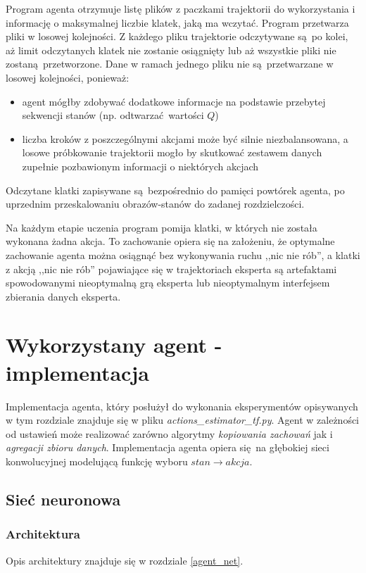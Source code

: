 \documentclass[polish,master,a4paper,oneside]{ppfcmthesis}
\begin{document}
Program agenta otrzymuje listę plików z paczkami trajektorii do wykorzystania i informację o maksymalnej liczbie klatek, jaką ma wczytać. Program przetwarza pliki w losowej kolejności. Z każdego pliku trajektorie odczytywane są po kolei, aż limit odczytanych klatek nie zostanie osiągnięty lub aż wszystkie pliki nie zostaną przetworzone.
Dane w ramach jednego pliku nie są przetwarzane w losowej kolejności, ponieważ:
\begin{itemize}
\item{agent mógłby zdobywać dodatkowe informacje na podstawie przebytej sekwencji stanów (np. odtwarzać wartości $Q$)}
\item{liczba kroków z poszczególnymi akcjami może być silnie niezbalansowana, a losowe próbkowanie trajektorii mogło by skutkować zestawem danych zupełnie pozbawionym informacji o niektórych akcjach}
\end{itemize}
Odczytane klatki zapisywane są bezpośrednio do pamięci powtórek agenta, po uprzednim przeskalowaniu obrazów-stanów do zadanej rozdzielczości.

Na każdym etapie uczenia program pomija klatki, w których nie została wykonana żadna akcja. To zachowanie opiera się na założeniu, że optymalne zachowanie agenta można osiągnąć bez wykonywania ruchu ,,nic nie rób'', a klatki z akcją ,,nic nie rób'' pojawiające się w trajektoriach eksperta są artefaktami spowodowanymi nieoptymalną grą eksperta lub nieoptymalnym interfejsem zbierania danych eksperta.
 \section{Wykorzystany agent - implementacja}

Implementacja agenta, który posłużył do wykonania eksperymentów opisywanych w tym rozdziale znajduje się w pliku \textit{actions\_estimator\_tf.py}. Agent w zależności od ustawień może realizować zarówno algorytmy \textit{kopiowania zachowań} jak i \textit{agregacji zbioru danych}. Implementacja agenta opiera się na głębokiej sieci konwolucyjnej modelującą funkcję wyboru $stan \rightarrow akcja$.


\subsection{Sieć neuronowa}

\subsubsection{Architektura}
Opis architektury znajduje się w rozdziale \ref{agent_net}.
\end{document}
